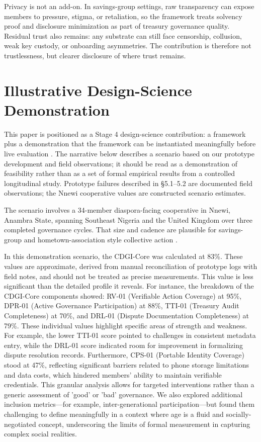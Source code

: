 \documentclass[review,onecolumn]{elsarticle}
\begin{document}
Privacy is not an add-on. In savings-group settings, raw transparency can expose members to pressure, stigma, or retaliation, so the framework treats solvency proof and disclosure minimization as part of treasury governance quality. Residual trust also remains: any substrate can still face censorship, collusion, weak key custody, or onboarding asymmetries. The contribution is therefore not trustlessness, but clearer disclosure of where trust remains.

\section{Illustrative Design-Science Demonstration}


This paper is positioned as a Stage 4 design-science contribution: a framework plus a demonstration that the framework can be instantiated meaningfully before live evaluation \cite{hevner2004, peffers2007, dresch2015}. The narrative below describes a scenario based on our prototype development and field observations; it should be read as a demonstration of feasibility rather than as a set of formal empirical results from a controlled longitudinal study. Prototype failures described in §5.1–5.2 are documented field observations; the Nnewi cooperative values are constructed scenario estimates.

The scenario involves a 34-member diaspora-facing cooperative in Nnewi, Anambra State, spanning Southeast Nigeria and the United Kingdom over three completed governance cycles. That size and cadence are plausible for savings-group and hometown-association style collective action \cite{besley1993}.

In this demonstration scenario, the CDGI-Core was calculated at 83\%. These values are approximate, derived from manual reconciliation of prototype logs with field notes, and should not be treated as precise measurements. This value is less significant than the detailed profile it reveals. For instance, the breakdown of the CDGI-Core components showed: RV-01 (Verifiable Action Coverage) at 95\%, DPR-01 (Active Governance Participation) at 88\%, TTI-01 (Treasury Audit Completeness) at 70\%, and DRL-01 (Dispute Documentation Completeness) at 79\%. These individual values highlight specific areas of strength and weakness. For example, the lower TTI-01 score pointed to challenges in consistent metadata entry, while the DRL-01 score indicated room for improvement in formalizing dispute resolution records. Furthermore, CPS-01 (Portable Identity Coverage) stood at 47\%, reflecting significant barriers related to phone storage limitations and data costs, which hindered members’ ability to maintain verifiable credentials. This granular analysis allows for targeted interventions rather than a generic assessment of 'good' or 'bad' governance. We also explored additional inclusion metrics---for example, inter-generational participation---but found them challenging to define meaningfully in a context where age is a fluid and socially-negotiated concept, underscoring the limits of formal measurement in capturing complex social realities.
\end{document}
